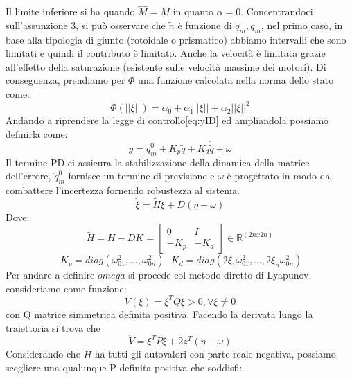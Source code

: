 Il limite inferiore si ha quando $\hat{M} = M$ in quanto $\alpha = 0$. Concentrandoci sull'assunzione 3, si può osservare che $\tilde{n}$ è funzione di $q_m,\dot{q_m}$, nel primo caso, in base alla tipologia di giunto (rotoidale o prismatico) abbiamo intervalli che sono limitati e quindi il contributo è limitato. Anche la velocità è limitata grazie all'effetto della saturazione (esistente sulle velocità massime dei motori). Di conseguenza, prendiamo per $\Phi$ una funzione calcolata nella norma dello stato come:
\begin{equation}
\Phi(||\xi||) = \alpha_0 + \alpha_1 ||\xi|| + \alpha_2 ||\xi||^2
\end{equation}
Andando a riprendere la legge di controllo\ref{eq:yID} ed ampliandola possiamo definirla come: 
\begin{equation}
y = \ddot{q}^0_m + K_p\tilde{q} + K_d\dot{\tilde{q}} + \omega
\label{eq:yRob}
\end{equation}
Il termine PD ci assicura la stabilizzazione della dinamica della matrice dell'errore, $\ddot{q}^0_m$ fornisce un termine di previsione e $\omega$ è progettato in modo da combattere l'incertezza fornendo robustezza al sistema.
\begin{equation}
\dot{\xi} = \tilde{H}\xi + D(\eta-\omega)
\end{equation}
Dove:
\begin{equation*}
\tilde{H} = H-DK = \begin{bmatrix}
0 & I \\ -K_p & -K_d
\end{bmatrix} \in 
\mathbb{R}^{(2nx2n)}
\end{equation*}
\begin{equation*}
 \ K_p = diag(\omega^2_{01}, \dots, \omega^2_{0n})  \ \ \  K_d = diag(2 \xi_1 \omega^2_{01}, \dots ,2 \xi_n \omega^2_{0n}) 
\end{equation*}
Per andare a definire $omega$ si procede col metodo diretto di Lyapunov; consideriamo come funzione:
\begin{equation}
V(\xi) = \xi^TQ\xi >0 , \forall \xi \neq 0
\end{equation}
con Q matrice simmetrica definita positiva. Facendo la derivata lungo la traiettoria si trova che
\begin{equation}
\dot{V} = \xi^T P\xi + 2z^T(\eta-\omega)
\label{eq:LyapDerivRob}
\end{equation}
Considerando che $\tilde{H}$ ha tutti gli autovalori con parte reale negativa, possiamo scegliere una qualunque P definita positiva che soddisfi:
